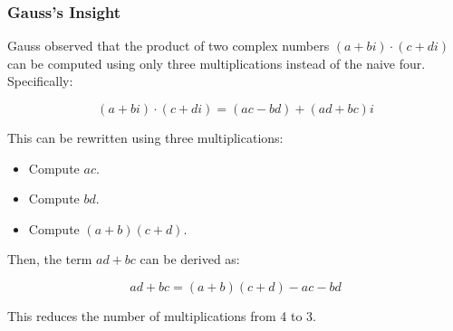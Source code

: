 \begin{frame}
    \frametitle{Gauss's Insight}

    Gauss observed that the product of two complex numbers \( (a + bi) \cdot (c + di) \) can be computed using only three multiplications instead of the naive four. Specifically:

    \[
    (a + bi) \cdot (c + di) = (ac - bd) + (ad + bc)i
    \]

    \vspace{0.5cm}

    This can be rewritten using three multiplications:

    \begin{itemize}
        \item Compute \( ac \).
        \item Compute \( bd \).
        \item Compute \( (a + b)(c + d) \).
    \end{itemize}

    \vspace{0.5cm}

    Then, the term \( ad + bc \) can be derived as:

    \[
    ad + bc = (a + b)(c + d) - ac - bd
    \]

    \vspace{0.5cm}

    This reduces the number of multiplications from 4 to 3.
\end{frame}







